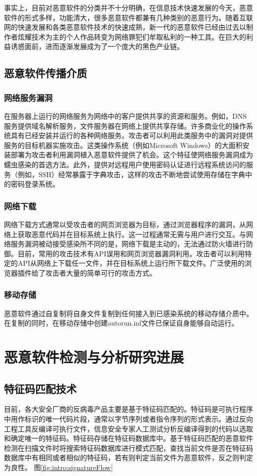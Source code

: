 事实上，目前对恶意软件的分类并不十分明确，在信息技术快速发展的今天，恶意软件的形式多样，功能清大，很多恶意软件都兼有几种类别的恶意行为。随着互联网的快速发展和各类恶意软件技术的快速成熟，新一代的恶意软件已经由过去以制作者炫耀技术为主的个人作品转变为网络罪犯们牟取私利的一种工具。在巨大的利益诱惑面前，进而逐渐发展成为了一个庞大的黑色产业链。

\subsection{恶意软件传播介质}
\subsubsection{网络服务漏洞}
在服务器上运行的网络服务为网络中的客户提供共享的资源和服务。例如，DNS服务提供域名解析服务，文件服务器在网络上提供共享存储。许多商业化的操作系统具有已经安装并运行的各种网络服务。攻击者可以利用此类服务中的漏洞对提供服务的目标机器实施攻击。这类操作系统（例如Microsoft Windows）的大面积安装部署为攻击者利用漏洞植入恶意软件提供了机会。这个特征使网络服务漏洞成为蠕虫感染的首选方法。此外，提供对远程用户使用密码认证进行远程系统访问的服务（例如，SSH）经常暴露于字典攻击，这样的攻击不断地尝试使用存储在字典中的密码登录系统。
\subsubsection{网络下载}
网络下载方式通常以受攻击者的网页浏览器为目标，通过浏览器程序的漏洞，从网络上获取恶意代码并在目标系统上执行。这一过程通常无需与用户进行交互。与网络服务漏洞被动接受感染所不同的是，网络下载是主动的，无法通过防火墙进行防御。目前，常用的攻击技术有API误用和网页浏览器漏洞利用。攻击者可以利用特定的API从网络上下载任一文件，并在目标系统上运行所下载文件。广泛使用的浏览器插件给了攻击者大量的简单可行的攻击方式。
\subsubsection{移动存储}
恶意软件通过自复制将自身文件复制到任何接入到已感染系统的移动存储介质中。在复制的同时，在移动存储中创建autorun.inf文件已保证自身能够自动运行。

\section{恶意软件检测与分析研究进展}
\subsection{特征码匹配技术}
目前，各大安全厂商的反病毒产品主要是基于特征码匹配的。特征码是可执行程序中用作标识的唯一代码片段，通常以字节序列或者指令序列的形式表示。通过反向工程工具反编译可执行文件，信息安全专家人工测试分析反编译得到的代码以选取和确定唯一的特征码。特征码存储在特征码数据库中。基于特征码匹配的恶意软件检测在扫描文件时将搜索特征码数据库进行模式匹配，查找当前文件是否在特征码数据库中有相同或者相似的特征码，若有则判定当前文件为恶意软件，反之则判定为良性。
图\ref{fig:intro:signatureFlow}

